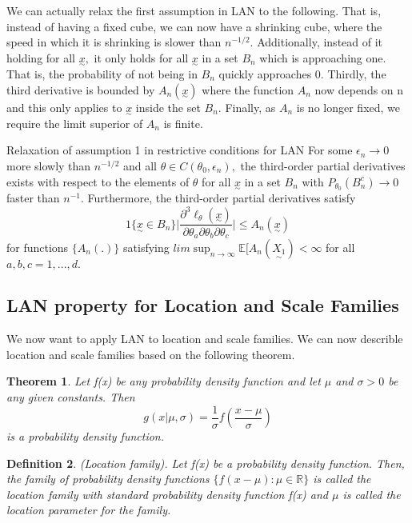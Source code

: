\documentclass[twoside]{article}
\newcounter{lecnum}
\newtheorem{theorem}{Theorem}[lecnum]
\newtheorem{definition}[theorem]{Definition}
\newcommand{\utilde}{\underset{\sim}}
\begin{document}
We can actually relax the first assumption in LAN to the following. That is, instead of having a fixed cube, we can now have a shrinking cube, where the speed in which it is shrinking is slower than $n^{-1/2}.$ Additionally, instead of it holding for all $\utilde{x},$ it only holds for all $\utilde{x}$ in a set $B_n$ which is approaching one. That is, the probability of not being in $B_n$ quickly approaches 0. Thirdly, the third derivative is bounded by $A_n(\utilde{x})$ where the function $A_n$ now depends on n and this only applies to $\utilde{x}$ inside the set $B_n.$ Finally, as $A_n$ is no longer fixed, we require the limit superior of $A_n$ is finite.
\begin{proposition_exam}{Relaxation of assumption 1 in restrictive conditions for LAN}{} For some $\epsilon_n \rightarrow 0$ more slowly than $n^{-1/2}$ and all $\theta \in C(\theta_0, \epsilon_n),$ the third-order partial derivatives exists with respect to the elements of $\theta$ for all $\utilde{x}$ in a set $B_n$ with $P_{\theta_{0}}(B_n^c) \rightarrow 0$ faster than $n^{-1}.$ Furthermore, the third-order partial derivatives satisfy 
$$
1\{\utilde{x} \in B_n\}\bigg|\frac{\partial^3 \ell_{\theta}(\utilde{x})}{\partial \theta_{a}\partial \theta_{b}\partial \theta_{c}} \bigg| \leq A_n(\utilde{x})
$$
for functions $\{A_n(.)\}$ satisfying $lim \sup_{n \rightarrow \infty}\mathbb{E}[A_n(\utilde{X_1}) < \infty$ for all $a, b, c = 1,...,d.$
\end{proposition_exam}



\subsection{LAN property for Location and Scale Families}
We now want to apply LAN to location and scale families.
We can now describle location and scale families based on the following theorem.
\begin{theorem}Let f(x) be any probability density function and let $\mu$ and $\sigma > 0$ be any given constants. Then 
$$
g(x|\mu, \sigma) = \frac{1}{\sigma}f(\frac{x - \mu}{\sigma})
$$
is a probability density function.
\end{theorem}

\begin{definition}(Location family). Let f(x) be a probability density function. Then, the family of probability density functions $\{f(x - \mu): \mu \in \mathbb{R}\}$ is called the location family with standard probability density function f(x) and $\mu$ is called the location parameter for the family.
\end{definition}
\end{document}
